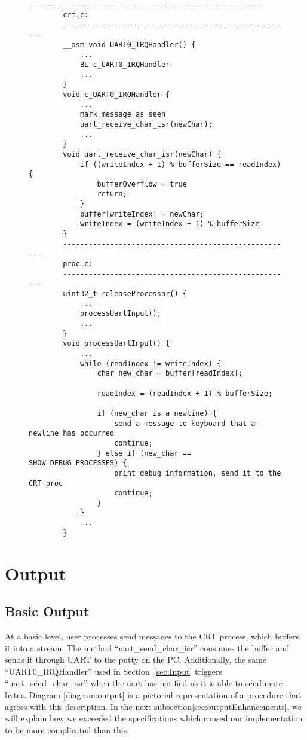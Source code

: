 \documentclass[12pt]{report}
\begin{document}
    \begin{figure}
        \centering
        \begin{lstlisting}[label=code:uart_input,caption={Input Pseudocode}]
        ------------------------------------------------------
        crt.c:
        ------------------------------------------------------
        __asm void UART0_IRQHandler() {
            ...
            BL c_UART0_IRQHandler
            ...
        }
        void c_UART0_IRQHandler {
            ...
            mark message as seen
            uart_receive_char_isr(newChar);
            ...
        }
        void uart_receive_char_isr(newChar) {
            if ((writeIndex + 1) % bufferSize == readIndex) {
                bufferOverflow = true
                return;
            }
            buffer[writeIndex] = newChar;
            writeIndex = (writeIndex + 1) % bufferSize
        }
        ------------------------------------------------------
        proc.c:
        ------------------------------------------------------
        uint32_t releaseProcessor() {
            ...
            processUartInput();
            ...
        }
        void processUartInput() {
            ...
            while (readIndex != writeIndex) {
                char new_char = buffer[readIndex];

                readIndex = (readIndex + 1) % bufferSize;

                if (new_char is a newline) {
                    send a message to keyboard that a newline has occurred
                    continue;
                } else if (new_char == SHOW_DEBUG_PROCESSES) {
                    print debug information, send it to the CRT proc
                    continue;
                }
            }
            ...
        }
        \end{lstlisting}
    \end{figure}
\section{Output}
\subsection{Basic Output}
    At a basic level, user processes send messages to the CRT process, which
    buffers it into a stream. The method ``uart\_send\_char\_isr'' consumes the
    buffer and sends it through UART to the putty on the PC. Additionally, the
    same ``UART0\_IRQHandler'' used in Section~\ref{sec:Input} triggers ``uart\_send\_char\_isr''
    when the uart has notified us it is able to send more bytes. Diagram \ref{diagram:output} is a pictorial representation of a
    procedure that agrees with this description. In the next
    subsection\ref{sec:outputEnhancements}, we will explain how we exceeded the
    specifications which caused our implementation to be more complicated than
    this.
\end{document}
